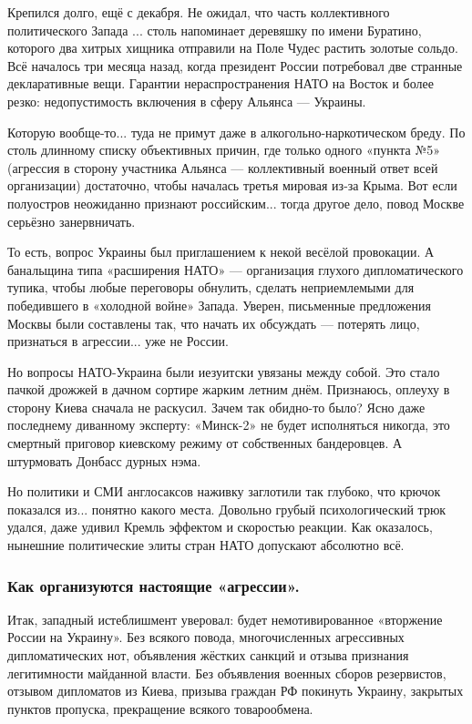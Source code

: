 Крепился долго, ещё с декабря. Не ожидал, что часть коллективного политического
Запада ... столь напоминает деревяшку по имени Буратино, которого два хитрых
хищника отправили на Поле Чудес растить золотые сольдо. Всё началось три месяца
назад, когда президент России потребовал две странные декларативные вещи.
Гарантии нераспространения НАТО на Восток и более резко: недопустимость
включения в сферу Альянса — Украины.

Которую вообще-то... туда не примут даже в алкогольно-наркотическом бреду. По
столь длинному списку объективных причин, где только одного «пункта №5»
(агрессия в сторону участника Альянса — коллективный военный ответ всей
организации) достаточно, чтобы началась третья мировая из-за Крыма. Вот если
полуостров неожиданно признают российским... тогда другое дело, повод Москве
серьёзно занервничать.

То есть, вопрос Украины был приглашением к некой весёлой провокации. А
банальщина типа «расширения НАТО» — организация глухого дипломатического
тупика, чтобы любые переговоры обнулить, сделать неприемлемыми для победившего
в «холодной войне» Запада. Уверен, письменные предложения Москвы были
составлены так, что начать их обсуждать — потерять лицо, признаться в
агрессии... уже не России.

Но вопросы НАТО-Украина были иезуитски увязаны между собой. Это стало пачкой
дрожжей в дачном сортире жарким летним днём. Признаюсь, оплеуху в сторону Киева
сначала не раскусил. Зачем так обидно-то было? Ясно даже последнему диванному
эксперту: «Минск-2» не будет исполняться никогда, это смертный приговор
киевскому режиму от собственных бандеровцев. А штурмовать Донбасс дурных нэма.


Но политики и СМИ англосаксов наживку заглотили так глубоко, что крючок
показался из... понятно какого места. Довольно грубый психологический трюк
удался, даже удивил Кремль эффектом и скоростью реакции. Как оказалось,
нынешние политические элиты стран НАТО допускают абсолютно всё.

\subsubsection{Как организуются настоящие «агрессии».}

Итак, западный истеблишмент уверовал: будет немотивированное «вторжение России
на Украину». Без всякого повода, многочисленных агрессивных дипломатических
нот, объявления жёстких санкций и отзыва признания легитимности майданной
власти. Без объявления военных сборов резервистов, отзывом дипломатов из Киева,
призыва граждан РФ покинуть Украину, закрытых пунктов пропуска, прекращение
всякого товарообмена.

